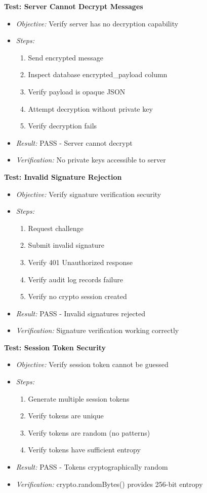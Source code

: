 \textbf{Test: Server Cannot Decrypt Messages}
\begin{itemize}
    \item \textit{Objective:} Verify server has no decryption capability
    \item \textit{Steps:}
    \begin{enumerate}
        \item Send encrypted message
        \item Inspect database encrypted\_payload column
        \item Verify payload is opaque JSON
        \item Attempt decryption without private key
        \item Verify decryption fails
    \end{enumerate}
    \item \textit{Result:} PASS - Server cannot decrypt
    \item \textit{Verification:} No private keys accessible to server
\end{itemize}

\textbf{Test: Invalid Signature Rejection}
\begin{itemize}
    \item \textit{Objective:} Verify signature verification security
    \item \textit{Steps:}
    \begin{enumerate}
        \item Request challenge
        \item Submit invalid signature
        \item Verify 401 Unauthorized response
        \item Verify audit log records failure
        \item Verify no crypto session created
    \end{enumerate}
    \item \textit{Result:} PASS - Invalid signatures rejected
    \item \textit{Verification:} Signature verification working correctly
\end{itemize}

\textbf{Test: Session Token Security}
\begin{itemize}
    \item \textit{Objective:} Verify session token cannot be guessed
    \item \textit{Steps:}
    \begin{enumerate}
        \item Generate multiple session tokens
        \item Verify tokens are unique
        \item Verify tokens are random (no patterns)
        \item Verify tokens have sufficient entropy
    \end{enumerate}
    \item \textit{Result:} PASS - Tokens cryptographically random
    \item \textit{Verification:} crypto.randomBytes() provides 256-bit entropy
\end{itemize}

